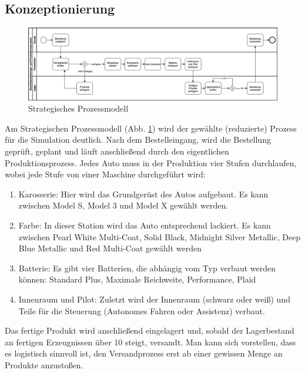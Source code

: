 \subsection{Konzeptionierung}
\begin{figure}[]
    \centering
    \includegraphics[width=\textwidth]{ausarbeitung-latex/img/Prozessmodell.png}
    \caption{Strategisches Prozessmodell}
    \label{fig:bpmn}
\end{figure}
Am Strategischen Prozessmodell (Abb. \ref{fig:bpmn}) wird der gewählte (reduzierte) Prozess für die Simulation deutlich. Nach dem Bestelleingang, wird die Bestellung geprüft, geplant und läuft anschließend durch den eigentlichen Produktionsprozess. Jedes Auto muss in der Produktion vier Stufen durchlaufen, wobei jede Stufe von einer Maschine durchgeführt wird:
\begin{enumerate}
    \item Karosserie: Hier wird das Grundgerüst des Autos aufgebaut. Es kann zwischen Model S, Model 3 und Model X gewählt werden.
    \item Farbe: In dieser Station wird das Auto entsprechend lackiert. Es kann zwischen Pearl White Multi-Coat, Solid Black, Midnight Silver Metallic, Deep Blue Metallic und Red Multi-Coat gewählt werden
    \item Batterie: Es gibt vier Batterien, die abhängig vom Typ verbaut werden können: Standard Plus, Maximale Reichweite, Performance, Plaid
    \item Innenraum und Pilot: Zuletzt wird der Innenraum (schwarz oder weiß) und Teile für die Steuerung (Autonomes Fahren oder Assistenz) verbaut.
\end{enumerate} 
Das fertige Produkt wird anschließend eingelagert und, sobald der Lagerbestand an fertigen Erzeugnissen über 10 steigt, versandt. Man kann sich vorstellen, dass es logistisch sinnvoll ist, den Versandprozess erst ab einer gewissen Menge an Produkte anzustoßen.

